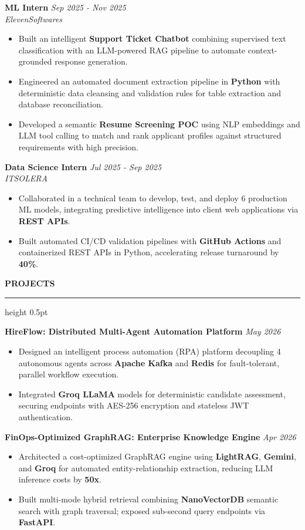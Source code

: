 \documentclass[10pt,letterpaper]{article}
\newcommand{\resumesection}[1]{%
  \vspace{3.5pt}%
  {\fontsize{10.5pt}{12pt}\selectfont\textbf{\MakeUppercase{#1}}}%
  \vspace{1.5pt}%
  \hrule height 0.5pt%
  \vspace{2.5pt}%
}
\begin{document}
\vspace{2pt}
\noindent\textbf{ML Intern} \hfill \textit{Sep 2025 - Nov 2025} \\
\textit{ElevenSoftwares}
\begin{itemize}
  \item Built an intelligent \textbf{Support Ticket Chatbot} combining supervised text classification with an LLM-powered RAG pipeline to automate context-grounded response generation.
  \item Engineered an automated document extraction pipeline in \textbf{Python} with deterministic data cleansing and validation rules for table extraction and database reconciliation.
  \item Developed a semantic \textbf{Resume Screening POC} using NLP embeddings and LLM tool calling to match and rank applicant profiles against structured requirements with high precision.
\end{itemize}

\vspace{2pt}
\noindent\textbf{Data Science Intern} \hfill \textit{Jul 2025 - Sep 2025} \\
\textit{ITSOLERA}
\begin{itemize}
  \item Collaborated in a technical team to develop, test, and deploy 6 production ML models, integrating predictive intelligence into client web applications via \textbf{REST APIs}.
  \item Built automated CI/CD validation pipelines with \textbf{GitHub Actions} and containerized REST APIs in Python, accelerating release turnaround by \textbf{40\%}.
\end{itemize}

\resumesection{Projects}
\noindent\textbf{HireFlow: Distributed Multi-Agent Automation Platform} \hfill \textit{May 2026}
\begin{itemize}
  \item Designed an intelligent process automation (RPA) platform decoupling 4 autonomous agents across \textbf{Apache Kafka} and \textbf{Redis} for fault-tolerant, parallel workflow execution.
  \item Integrated \textbf{Groq LLaMA} models for deterministic candidate assessment, securing endpoints with AES-256 encryption and stateless JWT authentication.
\end{itemize}

\vspace{2pt}
\noindent\textbf{FinOps-Optimized GraphRAG: Enterprise Knowledge Engine} \hfill \textit{Apr 2026}
\begin{itemize}
  \item Architected a cost-optimized GraphRAG engine using \textbf{LightRAG}, \textbf{Gemini}, and \textbf{Groq} for automated entity-relationship extraction, reducing LLM inference costs by \textbf{50x}.
  \item Built multi-mode hybrid retrieval combining \textbf{NanoVectorDB} semantic search with graph traversal; exposed sub-second query endpoints via \textbf{FastAPI}.
\end{itemize}
\end{document}
